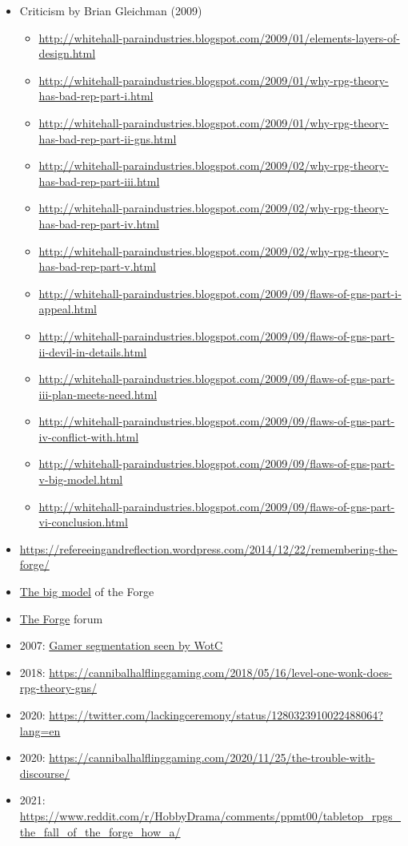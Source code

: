 \documentclass[a4paper, 11pt, twoside]{article}
\begin{document}
\begin{itemize}
\begin{itemize}
\end{itemize}
\item Criticism by Brian Gleichman (2009)
\begin{itemize}
\item \url{http://whitehall-paraindustries.blogspot.com/2009/01/elements-layers-of-design.html}
\item \url{http://whitehall-paraindustries.blogspot.com/2009/01/why-rpg-theory-has-bad-rep-part-i.html}
\item \url{http://whitehall-paraindustries.blogspot.com/2009/01/why-rpg-theory-has-bad-rep-part-ii-gns.html}
\item \url{http://whitehall-paraindustries.blogspot.com/2009/02/why-rpg-theory-has-bad-rep-part-iii.html}
\item \url{http://whitehall-paraindustries.blogspot.com/2009/02/why-rpg-theory-has-bad-rep-part-iv.html}
\item \url{http://whitehall-paraindustries.blogspot.com/2009/02/why-rpg-theory-has-bad-rep-part-v.html}
\item \url{http://whitehall-paraindustries.blogspot.com/2009/09/flaws-of-gns-part-i-appeal.html}
\item \url{http://whitehall-paraindustries.blogspot.com/2009/09/flaws-of-gns-part-ii-devil-in-details.html}
\item \url{http://whitehall-paraindustries.blogspot.com/2009/09/flaws-of-gns-part-iii-plan-meets-need.html}
\item \url{http://whitehall-paraindustries.blogspot.com/2009/09/flaws-of-gns-part-iv-conflict-with.html}
\item \url{http://whitehall-paraindustries.blogspot.com/2009/09/flaws-of-gns-part-v-big-model.html}
\item \url{http://whitehall-paraindustries.blogspot.com/2009/09/flaws-of-gns-part-vi-conclusion.html}
\end{itemize}
\item \url{https://refereeingandreflection.wordpress.com/2014/12/22/remembering-the-forge/}
\item \href{http://big-model.info/}{The big model} of the Forge
\item \href{http://www.indie-rpgs.com/forge/index.php}{The Forge} forum
\item 2007: \href{https://github.com/orey/ttrpg/blob/master/\_Articles/2007-RSDanceyOnTheWeb-GamerSegmentation.org}{Gamer segmentation seen by WotC}
\item 2018: \url{https://cannibalhalflinggaming.com/2018/05/16/level-one-wonk-does-rpg-theory-gns/}
\item 2020: \url{https://twitter.com/lackingceremony/status/1280323910022488064?lang=en}
\item 2020: \url{https://cannibalhalflinggaming.com/2020/11/25/the-trouble-with-discourse/}
\item 2021: \url{https://www.reddit.com/r/HobbyDrama/comments/ppmt00/tabletop\_rpgs\_the\_fall\_of\_the\_forge\_how\_a/}
\end{itemize}
\end{document}
